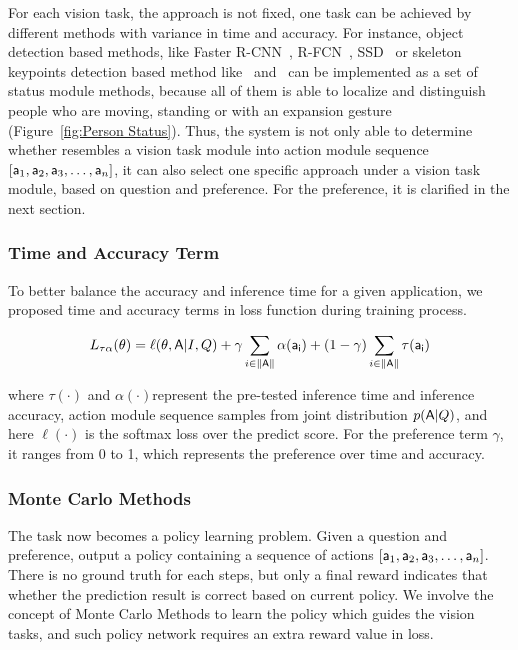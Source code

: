 For each vision task, the approach is not fixed, one task can be achieved by different methods with variance in time and accuracy. For instance, object detection based methods, like Faster R-CNN~\cite{Ren:2015:FRT:2969239.2969250}, R-FCN~\cite{DBLP:conf/nips/DaiLHS16}, SSD~\cite{DBLP:conf/eccv/LiuAESRFB16} or skeleton keypoints detection based method like~\cite{cao2017realtime} and~\cite{wei2016cpm} can be implemented as a set of status module methods, because all of them is able to localize and distinguish people who are moving, standing or with an expansion gesture (Figure~\ref{fig:Person Status}). Thus, the system is not only able to determine whether resembles a vision task module into action module sequence $[{\mathsf{a}}_1,{\mathsf{a}}_2,{\mathsf{a}}_3,\dots,{\mathsf{a}}_n]$, it can also select one specific approach under a vision task module, based on question and preference. For the preference, it is clarified in the next section.


\subsubsection{Time and Accuracy Term}
\label{sec-TimeAcc}
\hspace{\parindent} To better balance the accuracy and inference time for a given application, we proposed time and accuracy terms in loss function during training process.

\begin{small}
\begin{equation} 
    L_{\tau\alpha}(\theta) = \ell(\theta,{\mathsf{A}}|I, Q) + \gamma\sum_{i\in\|{\mathsf{A}}\|}\alpha({\mathsf{a_i}}) + (1-\gamma)\sum_{i\in\|{\mathsf{A}}\|}\tau({\mathsf{a_i}})
\end{equation}
\end{small}

\noindent where $\tau(\cdot)$ and $\alpha(\cdot)$represent the pre-tested inference time and inference accuracy, action module sequence  samples from joint distribution $p({\mathsf{A}}|Q)$, and here $\ell(\cdot)$ is the softmax loss over the predict score. For the preference term $\gamma$, it ranges from 0 to 1, which represents the preference over time and accuracy.

\subsubsection{Monte Carlo Methods}
\label{sec-MC}
\hspace{\parindent} The task now becomes a policy learning problem. Given a question and preference, output a policy containing a sequence of actions $[{\mathsf{a}}_1,{\mathsf{a}}_2,{\mathsf{a}}_3,\dots,{\mathsf{a}}_n]$. There is no ground truth for each steps, but only a final reward indicates that whether the prediction result is correct based on current policy. We involve the concept of Monte Carlo Methods to learn the policy which guides the vision tasks, and such policy network requires an extra reward value in loss.

